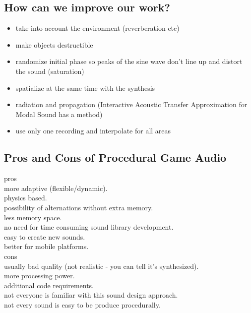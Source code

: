 \subsection{How can we improve our work?}
\begin{itemize}
\item take into account the environment (reverberation etc)
\item make objects destructible
\item randomize initial phase so peaks of the sine wave don't line up and distort the sound (saturation)
\item spatialize at the same time with the synthesis
\item radiation and propagation (Interactive Acoustic Transfer Approximation for Modal Sound has a method)
\item use only one recording and interpolate for all areas
\end{itemize}

\subsection{Pros and Cons of Procedural Game Audio}
pros\\
more adaptive (flexible/dynamic).\\
physics based.\\
possibility of alternations without extra memory.\\
less memory space.\\
no need for time consuming sound library development.\\
easy to create new sounds.\\
better for mobile platforms.\\

cons\\
usually bad quality (not realistic - you can tell it's synthesized).\\
more processing power.\\
additional code requirements.\\
not everyone is familiar with this sound design approach.\\
not every sound is easy to be produce procedurally.\\
